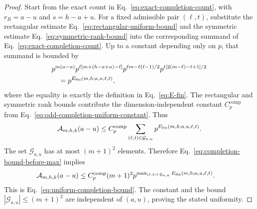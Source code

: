 \documentclass[11pt]{article}
\newcommand{\1}{\mathbf 1}
\theoremstyle{plain}
\theoremstyle{definition}
\theoremstyle{remark}
\begin{document}
\begin{proof}
Start from the exact count in Eq.~\eqref{eq:exact-completion-count}, with
$r_B=a-u$ and $s=h-a+u$.  For a fixed admissible pair $(\ell,t)$,
substitute the rectangular estimate Eq.~\eqref{eq:rectangular-uniform-bound}
and the symmetric estimate Eq.~\eqref{eq:symmetric-rank-bound} into the
corresponding summand of Eq.~\eqref{eq:exact-completion-count}.  Up to a
constant depending only on $p$, that summand is bounded by
\begin{align}
 &p^{m(a-u)}
 p^{\ell[m+(h-a+u)-\ell]}
 p^{\ell m-\ell(\ell-1)/2}
 p^{t[2(m-\ell)-t+1]/2}\notag\\
 &\quad
 =p^{E_{\rm fin}(m,h;a,u,\ell,t)},
 \label{eq:completion-summand-exponent-assembly}
\end{align}
where the equality is exactly the definition in Eq.~\eqref{eq:E-fin}.  The
rectangular and symmetric rank bounds contribute the dimension-independent constant
$C_p^{\mathrm{comp}}$ from
Eq.~\eqref{eq:odd-completion-uniform-constant}.  Thus
\begin{equation}
 \mathcal A_{m,h,k}(a-u)
 \le C_p^{\mathrm{comp}}\sum_{(\ell,t)\in\mathcal G_{a,u}}
 p^{E_{\rm fin}(m,h;a,u,\ell,t)}.
 \label{eq:completion-bound-before-max}
\end{equation}
The set $\mathcal G_{a,u}$ has at most $(m+1)^2$ elements.  Therefore
Eq.~\eqref{eq:completion-bound-before-max} implies
\begin{align}
 \mathcal A_{m,h,k}(a-u)
 &\le C_p^{\mathrm{comp}}(m+1)^2
 p^{\max_{(\ell,t)\in\mathcal G_{a,u}}
 E_{\rm fin}(m,h;a,u,\ell,t)}.
 \label{eq:completion-max-term-bound}
\end{align}
This is Eq.~\eqref{eq:uniform-completion-bound}.  The constant and the bound
$|\mathcal G_{a,u}|\le(m+1)^2$ are independent of $(a,u)$, proving the stated
uniformity.
\end{proof}
\end{document}
